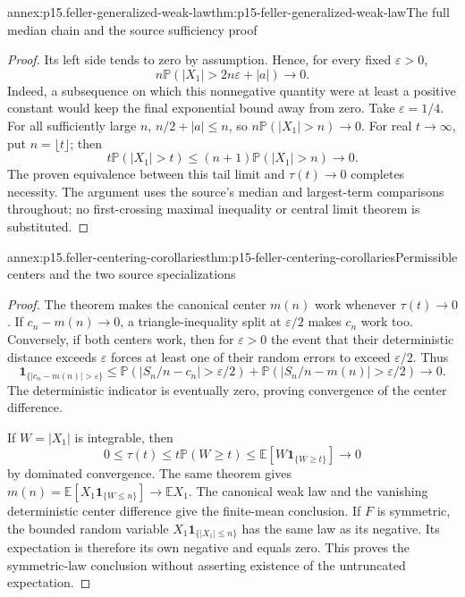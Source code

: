 \begin{annexitem}{annex:p15.feller-generalized-weak-law}{thm:p15-feller-generalized-weak-law}{The full median chain and the source sufficiency proof}
\begin{proof}
Its left side tends to zero by assumption. Hence, for every fixed
\(\varepsilon>0\),
\[
 n\mathbb P(|X_1|>2n\varepsilon+|a|)\longrightarrow0.
\]
Indeed, a subsequence on which this nonnegative quantity were at
least a positive constant would keep the final exponential bound
away from zero. Take \(\varepsilon=1/4\). For all sufficiently
large \(n\), \(n/2+|a|\leq n\), so
\(n\mathbb P(|X_1|>n)\to0\).
For real \(t\to\infty\), put \(n=\lfloor t\rfloor\); then
\[
 t\mathbb P(|X_1|>t)
       \leq(n+1)\mathbb P(|X_1|>n)\longrightarrow0.
\]
The proven equivalence between this tail limit and \(\tau(t)\to0\)
completes necessity. The argument uses the source's median and
largest-term comparisons throughout; no first-crossing maximal
inequality or central limit theorem is substituted.
\end{proof}
\end{annexitem}

\begin{annexitem}{annex:p15.feller-centering-corollaries}{thm:p15-feller-centering-corollaries}{Permissible centers and the two source specializations}
\begin{proof}
The theorem makes the canonical center \(m(n)\) work whenever
\(\tau(t)\to0\). If \(c_n-m(n)\to0\), a triangle-inequality
split at \(\varepsilon/2\) makes \(c_n\) work too.
Conversely, if both centers work, then for \(\varepsilon>0\)
the event that their deterministic distance exceeds \(\varepsilon\)
forces at least one of their random errors to exceed
\(\varepsilon/2\). Thus
\[
 \mathbf1_{\{|c_n-m(n)|>\varepsilon\}}
 \leq\mathbb P(|S_n/n-c_n|>\varepsilon/2)
       +\mathbb P(|S_n/n-m(n)|>\varepsilon/2)\longrightarrow0.
\]
The deterministic indicator is eventually zero, proving convergence
of the center difference.

If \(W=|X_1|\) is integrable, then
\[
 0\leq\tau(t)\leq t\mathbb P(W\geq t)
                    \leq\mathbb E[W\mathbf1_{\{W\geq t\}}]\longrightarrow0
\]
by dominated convergence. The same theorem gives
\(m(n)=\mathbb E[X_1\mathbf1_{\{W\leq n\}}]\to\mathbb EX_1\).
The canonical weak law and the vanishing deterministic center
difference give the finite-mean conclusion.
If \(F\) is symmetric, the bounded random variable
\(X_1\mathbf1_{\{|X_1|\leq n\}}\) has the same law as its
negative. Its expectation is therefore its own negative and equals
zero. This proves the symmetric-law conclusion without asserting
existence of the untruncated expectation.
\end{proof}
\end{annexitem}

